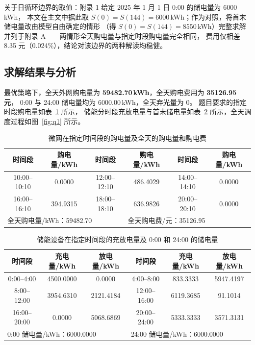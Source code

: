 关于日循环边界的取值：附录 1 给定 2025 年 1 月 1 日 0:00 的储电量为 6000\,kWh，
本文在主文中据此取 $S(0)=S(144)=6000$\,kWh；作为对照，将首末储电量改由模型自由确定的情形
（得 $S(0)=S(144)=8550$\,kWh）完整求解并列于附录 A——两情形全天购电量与指定时段购电量完全相同，
费用仅相差 8.35 元（0.024\%），结论对该边界的两种解读均稳健。

\subsection{求解结果与分析}
最优策略下，全天外网购电量为 \textbf{59482.70\,kWh}，全天购电费用为 \textbf{35126.95 元}，
0:00 与 24:00 储电量均为 6000.00\,kWh，全天弃光量为 0。
题目要求的指定时段购电量如表~\ref{tab:q1-plan} 所示，
储能分时段充放电量与首末储电量如表~\ref{tab:q1-soc} 所示，全天调度过程如图~\ref{fig:q1} 所示。

\begin{table}[!htbp]
\caption{微网在指定时间段的购电量及全天的购电量和购电费}\label{tab:q1-plan}
\centering
\begin{tabular}{cccccc}
\toprule
时间段 & 购电量/kWh & 时间段 & 购电量/kWh & 时间段 & 购电量/kWh \\
\midrule
10:00--10:10 & 0.0000 & 12:00--12:10 & 486.4029 & 14:00--14:10 & 0.0000 \\
16:00--16:10 & 394.9315 & 18:00--18:10 & 636.9826 & 20:00--20:10 & 0.0000 \\
\multicolumn{3}{l}{全天购电量/kWh：59482.70} & \multicolumn{3}{l}{全天购电费/元：35126.95} \\
\bottomrule
\end{tabular}
\end{table}

\begin{table}[!htbp]
\caption{储能设备在指定时间段的充放电量及 0:00 和 24:00 的储电量}\label{tab:q1-soc}
\centering
\begin{tabular}{cccccc}
\toprule
时间段 & 充电量/kWh & 放电量/kWh & 时间段 & 充电量/kWh & 放电量/kWh \\
\midrule
0:00--4:00   & 4500.0000 & 0.0000    & 4:00--8:00   & 833.3333  & 5947.4197 \\
8:00--12:00  & 3954.6310 & 2121.4184 & 12:00--16:00 & 6119.3685 & 91.1014 \\
16:00--20:00 & 0.0000    & 5068.6869 & 20:00--24:00 & 5333.3333 & 3571.3131 \\
\multicolumn{3}{l}{0:00 储电量/kWh：6000.0000} & \multicolumn{3}{l}{24:00 储电量/kWh：6000.0000} \\
\bottomrule
\end{tabular}
\end{table}

